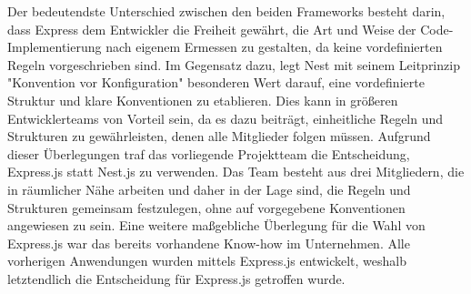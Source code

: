 Der bedeutendste Unterschied zwischen den beiden Frameworks besteht darin, dass Express dem Entwickler die Freiheit gewährt, die Art und Weise der Code-Implementierung nach eigenem Ermessen zu gestalten, da keine vordefinierten Regeln vorgeschrieben sind. Im Gegensatz dazu, legt Nest mit seinem Leitprinzip "Konvention vor Konfiguration" besonderen Wert darauf, eine vordefinierte Struktur und klare Konventionen zu etablieren. Dies kann in größeren Entwicklerteams von Vorteil sein, da es dazu beiträgt, einheitliche Regeln und Strukturen zu gewährleisten, denen alle Mitglieder folgen müssen.
\newline
Aufgrund dieser Überlegungen traf das vorliegende Projektteam die Entscheidung, Express.js statt Nest.js zu verwenden. Das Team besteht aus drei Mitgliedern, die in räumlicher Nähe arbeiten und daher in der Lage sind, die Regeln und Strukturen gemeinsam festzulegen, ohne auf vorgegebene Konventionen angewiesen zu sein. Eine weitere maßgebliche Überlegung für die Wahl von Express.js war das bereits vorhandene Know-how im Unternehmen. Alle vorherigen Anwendungen wurden mittels Express.js entwickelt, weshalb letztendlich die Entscheidung für Express.js getroffen wurde.
\cite{express_js_vs_nest_js}